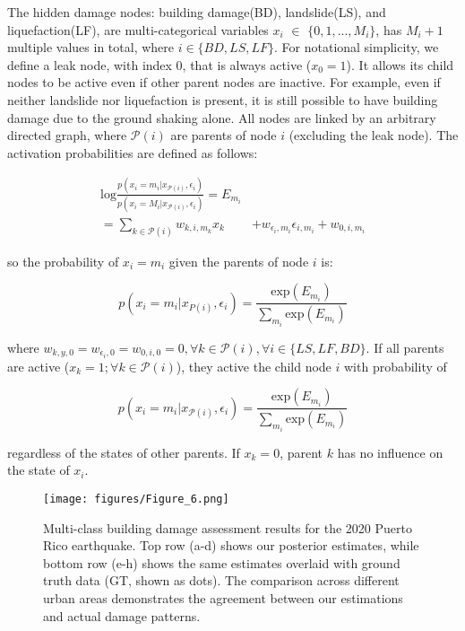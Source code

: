 \documentclass[review]{elsarticle}
\begin{document}
The hidden damage nodes: building damage(BD), landslide(LS), and liquefaction(LF), are multi-categorical variables $x_{i}$ $\in$ $\{0,1,..., M_{i}\}$, has $M_{i} + 1$ multiple values in total, where $i \in \{BD, LS, LF\}$. For notational simplicity, we define a leak node, with index 0, that is always active ($x_{0} = 1$). It allows its child nodes to be active even if other parent nodes are inactive. For example, even if neither landslide nor liquefaction is present, it is still possible to have building damage due to the ground shaking alone. All nodes are linked by an arbitrary directed graph, where $\mathcal{P}(i)$ are parents of node $i$ (excluding the leak node). The activation probabilities are defined as follows: 

\begin{equation} 
\begin{aligned}
    \text{log}\frac{p(x_{i} = m_{i}|x_{\mathcal{P}(i)},\epsilon_{i})}{p(x_{i} = M_{i}|x_{\mathcal{P}(i)},\epsilon_{i})} = E_{m_{i}}  & \\
  = \sum_{k \in {\mathcal{P}(i)}}w_{k,i, m_{k}}x_k & + w_{\epsilon_i, m_i}\epsilon_{i, m_i} + w_{ 0,i, m_i}
\end{aligned}
\label{Emi}
\end{equation}

\noindent so the probability of $x_{i} = m_{i}$ given the parents of node $i$ is: 

\begin{equation*}
    p(x_i = m_i|x_{P(i)}, \epsilon_i) = \frac{\text{exp}( E_{m_{i}})}{\sum_{m_i} \text{exp}(E_{m_{i}})}
\end{equation*}

\noindent where $w_{  k,y, 0} = w_{  \epsilon_i, 0} = w_{  0,i, 0} = 0, \forall k \in \mathcal{P}(i), \forall i \in \{LS, LF, BD\}$. If all parents are active ($x_{k} = 1; \forall k \in \mathcal{P}(i)$), they active the child node $i$ with probability of

\[ p(x_i = m_i|x_{\mathcal{P}(i)}, \epsilon_i) = \frac{\text{exp}( E_{m_{i}})}{\sum_{m_i} \text{exp}(E_{m_{i}})}\]

\noindent regardless of the states of other parents. If $x_{k} = 0$, parent $k$ has no influence on the state of $x_{i}$.

 \begin{figure*}[t]
    \centering
    \texttt{[image: figures/Figure\_6.png]}
    \caption{Multi-class building damage assessment results for the 2020 Puerto Rico earthquake. Top row (a-d) shows our posterior estimates, while bottom row (e-h) shows the same estimates overlaid with ground truth data (GT, shown as dots). The comparison across different urban areas demonstrates the agreement between our estimations and actual damage patterns.}
    \label{PR_mul}
\end{figure*}
\end{document}
